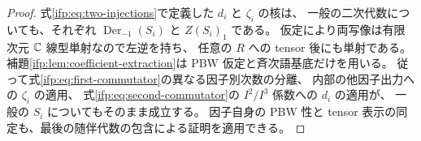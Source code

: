 \begin{proof}
式\eqref{ifp:eq:two-injections}で定義した $d_i$ と $\zeta_i$ の核は、
一般の二次代数についても、それぞれ
$\operatorname{Der}_{-1}(S_i)$ と $Z(S_i)_1$ である。
仮定により両写像は有限次元 $\mathbb C$ 線型単射なので左逆を持ち、
任意の $R$ への tensor 後にも単射である。
補題\ref{ifp:lem:coefficient-extraction}は PBW 仮定と斉次語基底だけを用いる。
従って式\eqref{ifp:eq:first-commutator}の異なる因子別次数の分離、
内部の他因子出力への $\zeta_i$ の適用、
式\eqref{ifp:eq:second-commutator}の $I^2/I^3$ 係数への $d_i$ の適用が、
一般の $S_i$ についてもそのまま成立する。
因子自身の PBW 性と tensor 表示の同定も、最後の随伴代数の包含による証明を適用できる。
\end{proof}
